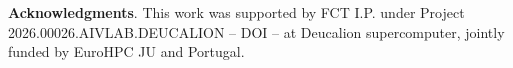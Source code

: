\documentclass[extendedabs]{recpad2k}
\begin{document}
\textbf{Acknowledgments}. This work was supported by FCT I.P. under Project
2026.00026.AIVLAB.DEUCALION – DOI – at Deucalion
supercomputer, jointly funded by EuroHPC JU and Portugal.

{\scriptsize

}
\end{document}
